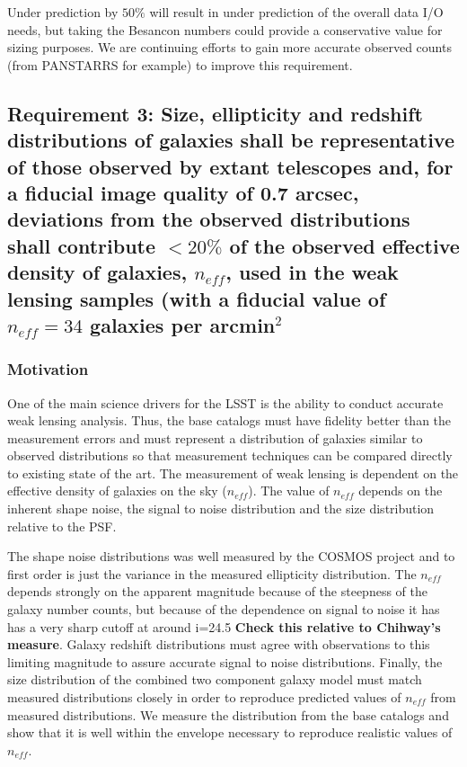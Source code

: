 \documentclass[]{article}
\begin{document}
Under prediction by $50\%$ will result in under prediction of the overall data I/O needs, but taking the Besancon numbers could provide a conservative value
for sizing purposes. We are continuing efforts to gain more accurate observed counts (from PANSTARRS for example) to improve this requirement. 

\subsection{Requirement 3: Size, ellipticity and redshift distributions of galaxies shall be representative of those observed by extant
telescopes and, for a fiducial image quality of 0.7 arcsec, deviations from the observed distributions shall
contribute $< 20\%$ of the observed effective density of galaxies, $n_{eff}$, used in the weak lensing samples (with a fiducial value of
$n_{eff} = 34$ galaxies per arcmin$^2$}
\subsubsection{Motivation}
One of the main science drivers for the LSST is the ability to conduct accurate weak lensing analysis.  Thus, the base catalogs must 
have fidelity better than the measurement errors and must represent a distribution of galaxies similar to observed distributions
so that measurement techniques can be compared directly to existing state of the art.  The measurement of weak lensing is dependent 
on the effective density of galaxies on the sky ($n_{eff}$).  The value of $n_{eff}$ depends on the inherent shape noise, the signal to noise distribution and the size distribution relative to the PSF.

The shape noise distributions was well measured by the COSMOS project and to first order is just the variance in the measured 
ellipticity distribution.  The $n_{eff}$ depends strongly on the apparent magnitude because of the steepness of the galaxy number
counts, but because of the dependence on signal to noise it has
has a very sharp cutoff at around i=24.5 {\bf Check this relative to Chihway's measure}.  Galaxy redshift distributions must
agree with observations to this limiting magnitude to assure accurate signal to noise distributions.  Finally, the size distribution
of the combined two component galaxy model must match measured distributions closely in order to reproduce predicted
values of $n_{eff}$ from measured distributions.  We measure the distribution from the base catalogs and show that it is well
within the envelope necessary to reproduce realistic values of $n_{eff}$.
\end{document}
